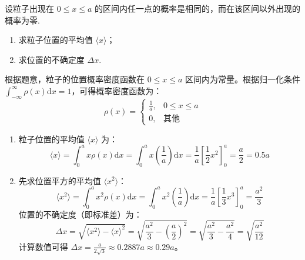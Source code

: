 \begin{exercise}\label{ex:24.3}
设粒子出现在 $0 \le x \le a$ 的区间内任一点的概率是相同的，而在该区间以外出现的概率为零. 
\begin{enumerate}
  \item[(a)] 求粒子位置的平均值 $\langle x \rangle$；
  \item[(b)] 求位置的不确定度 $\Delta x$.
\end{enumerate}
\end{exercise}
\begin{solution}
根据题意，粒子的位置概率密度函数在 $0 \le x \le a$ 区间内为常量。根据归一化条件 $\int_{-\infty}^{\infty} \rho(x) \mathrm{d}x = 1$，可得概率密度函数为：
$$ \rho(x) = \begin{cases} \frac{1}{a}, & 0 \le x \le a \\ 0, & \text{其他} \end{cases} $$

\begin{enumerate}
    \item[(a)] 粒子位置的平均值 $\langle x \rangle$ 为：
    $$ \langle x \rangle = \int_0^a x \rho(x) \mathrm{d}x = \int_0^a x \left( \frac{1}{a} \right) \mathrm{d}x = \frac{1}{a} \left[ \frac{1}{2} x^2 \right]_0^a = \frac{a}{2} = 0.5a $$

    \item[(b)] 先求位置平方的平均值 $\langle x^2 \rangle$：
    $$ \langle x^2 \rangle = \int_0^a x^2 \rho(x) \mathrm{d}x = \int_0^a x^2 \left( \frac{1}{a} \right) \mathrm{d}x = \frac{1}{a} \left[ \frac{1}{3} x^3 \right]_0^a = \frac{a^2}{3} $$
    位置的不确定度（即标准差）为：
    $$ \Delta x = \sqrt{\langle x^2 \rangle - \langle x \rangle^2} = \sqrt{\frac{a^2}{3} - \left(\frac{a}{2}\right)^2} = \sqrt{\frac{a^2}{3} - \frac{a^2}{4}} = \sqrt{\frac{a^2}{12}} $$
    计算数值可得 $\Delta x = \frac{a}{2\sqrt{3}} \approx 0.2887a \approx 0.29a$。
\end{enumerate}
\end{solution}

